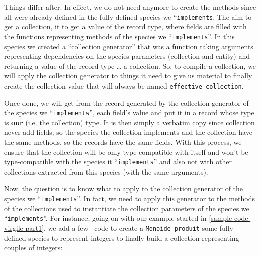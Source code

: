 Things differ after. In effect, we do not need anymore to create the
methods since all were already defined in the fully defined species we
``{\tt implements}. The aim to get a collection, it to get a value of
the record type, where fields are filled with the functions
representing methods of the species we ``{\tt implements}''. In this
species we created a ``collection generator'' that was a function
taking arguments representing dependencies on the species parameters
(collection and entity) and returning a value of the record type \ldots
a collection. So, to compile a collection, we will apply the
collection generator to things it need to give us material to finally
create the collection value that will always be named
{\tt effective\_collection}.

Once done, we will get from the record generated by the collection
generator of the species we ``{\tt implements}'', each field's value
and put it in a record whose type is {\bf our} (i.e. the collection)
type. It is then simply a verbatim copy since collection never add
fields; so the species the collection implements and the collection
have the same methods, so the records have the same fields. With this
process, we ensure that the collection will be only type-compatible
with itself and won't be type-compatible with the species it
``{\tt implements}'' and also not with other collections extracted
from this species (with the same arguments).

Now, the question is to know what to apply to the collection generator
of the species we ``{\tt implements}''. In fact, we need to apply this
generator to the methods of the collections used to instantiate the
collection parameters of the species we ``{\tt implements}''.
For instance, going on with our example started in
\ref{sample-code-virgile-part1}, we add a few \focalize\ code to
create a {\tt Monoide\_produit} some fully defined species to
represent integers to finally build a collection representing couples
of integers:

